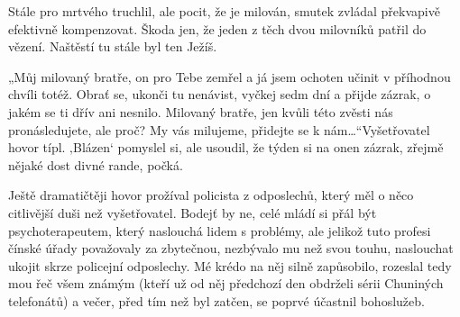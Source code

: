 Stále pro mrtvého truchlil, ale pocit, že je milován, smutek zvládal překvapivě efektivně kompenzovat. Škoda jen, že jeden z těch dvou milovníků patřil do vězení. Naštěstí tu stále byl ten Ježíš.

„Můj milovaný bratře, on pro Tebe zemřel a já jsem ochoten učinit v příhodnou chvíli totéž. Obrať se, ukonči tu nenávist, vyčkej sedm dní a přijde zázrak, o jakém se ti dřív ani nesnilo. Milovaný bratře, jen kvůli této zvěsti nás pronásledujete, ale proč? My vás milujeme, přidejte se k nám…“Vyšetřovatel hovor típl. ‚Blázen‘ pomyslel si, ale usoudil, že týden si na onen zázrak, zřejmě nějaké dost divné rande, počká.

Ještě dramatičtěji hovor prožíval policista z odposlechů, který měl o něco citlivější duši než vyšetřovatel. Bodejť by ne, celé mládí si přál být psychoterapeutem, který naslouchá lidem s problémy, ale jelikož tuto profesi čínské úřady považovaly za zbytečnou, nezbývalo mu než svou touhu, naslouchat ukojit skrze policejní odposlechy. Mé krédo na něj silně zapůsobilo, rozeslal tedy mou řeč všem známým (kteří už od něj předchozí den obdrželi sérii Chuniných telefonátů) a večer, před tím než byl zatčen, se poprvé účastnil bohoslužeb.
